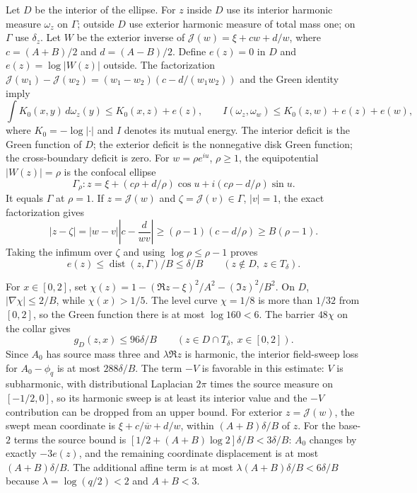 Let $D$ be the interior of the ellipse.  For $z$ inside $D$ use its interior
harmonic measure $\omega_z$ on $\Gamma$; outside $D$ use exterior harmonic
measure of total mass one; on $\Gamma$ use $\delta_z$.
Let $W$ be the exterior inverse of
$\mathcal J(w)=\xi+cw+d/w$, where $c=(A+B)/2$ and $d=(A-B)/2$.  Define
$e(z)=0$ in $D$ and $e(z)=\log|W(z)|$ outside.  The factorization
$\mathcal J(w_1)-\mathcal J(w_2)=(w_1-w_2)(c-d/(w_1w_2))$ and the Green
identity imply
\[
 \int K_0(x,y)\,d\omega_z(y)\le K_0(x,z)+e(z),\qquad
 I(\omega_z,\omega_w)\le K_0(z,w)+e(z)+e(w),
\]
where $K_0=-\log|\cdot|$ and $I$ denotes its mutual energy.  The interior
deficit is the Green function of $D$; the exterior deficit is the
nonnegative disk Green function; the cross-boundary deficit is zero.
For $w=\rho e^{iu}$, $\rho\ge1$, the equipotential $|W(z)|=\rho$ is
the confocal ellipse
\[
 \Gamma_\rho:
 z=\xi+(c\rho+d/\rho)\cos u+i(c\rho-d/\rho)\sin u.
\]
It equals $\Gamma$ at $\rho=1$.  If $z=\mathcal J(w)$ and
$\zeta=\mathcal J(v)\in\Gamma$, $|v|=1$, the exact factorization gives
\[
 |z-\zeta|=|w-v|\left|c-\frac{d}{wv}\right|
 \ge(\rho-1)(c-d/\rho)\ge B(\rho-1).
\]
Taking the infimum over $\zeta$ and using $\log\rho\le\rho-1$ proves
\[
 e(z)\le\operatorname{dist}(z,\Gamma)/B\le\delta/B
 \qquad(z\notin D,\ z\in T_\delta).
\]

For $x\in[0,2]$, set
$\chi(z)=1-(\Re z-\xi)^2/A^2-(\Im z)^2/B^2$.  On $D$,
$|\nabla\chi|\le2/B$, while $\chi(x)>1/5$.  The level curve
$\chi=1/8$ is more than $1/32$ from $[0,2]$, so the Green function there is
at most $\log160<6$.  The barrier $48\chi$ on the collar gives
\[
 g_D(z,x)\le96\delta/B\qquad(z\in D\cap T_\delta,\ x\in[0,2]).
\]
Since $A_0$ has source mass three and $\lambda\Re z$ is harmonic, the
interior field-sweep loss for $A_0-\phi_q$ is at most $288\delta/B$.
The term $-V$ is favorable in this estimate: $V$ is subharmonic, with
distributional Laplacian $2\pi$ times the source measure on
$[-1/2,0]$, so its harmonic sweep is at least its interior value and the
$-V$ contribution can be dropped from an upper bound.
For exterior $z=\mathcal J(w)$, the swept mean coordinate is
$\xi+c/\overline w+d/w$, within $(A+B)\delta/B$ of $z$.
For the base-$2$ terms the source bound is
$[1/2+(A+B)\log2]\delta/B<3\delta/B$: $A_0$ changes by exactly
$-3e(z)$, and the remaining coordinate displacement is at most
$(A+B)\delta/B$.  The additional affine term is at most
$\lambda(A+B)\delta/B<6\delta/B$ because
$\lambda=\log(q/2)<2$ and $A+B<3$.

